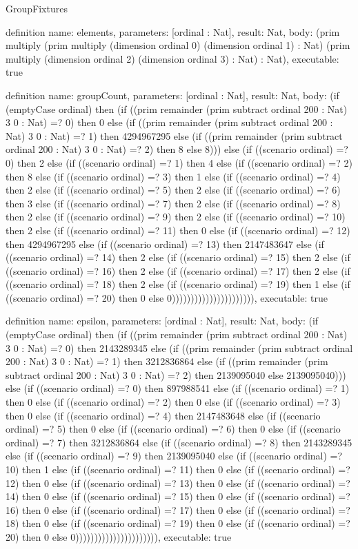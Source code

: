 \begin{lexlean}{GroupFixtures}
\begin{semanticmodule}
definition{
  name: elements,
  parameters: [ordinal : Nat],
  result: Nat,
  body: (prim multiply (prim multiply (dimension ordinal 0) (dimension ordinal 1) : Nat) (prim multiply (dimension ordinal 2) (dimension ordinal 3) : Nat) : Nat),
  executable: true
}

definition{
  name: groupCount,
  parameters: [ordinal : Nat],
  result: Nat,
  body: (if (emptyCase ordinal) then (if ((prim remainder (prim subtract ordinal 200 : Nat) 3 0 : Nat) =? 0) then 0 else (if ((prim remainder (prim subtract ordinal 200 : Nat) 3 0 : Nat) =? 1) then 4294967295 else (if ((prim remainder (prim subtract ordinal 200 : Nat) 3 0 : Nat) =? 2) then 8 else 8))) else (if ((scenario ordinal) =? 0) then 2 else (if ((scenario ordinal) =? 1) then 4 else (if ((scenario ordinal) =? 2) then 8 else (if ((scenario ordinal) =? 3) then 1 else (if ((scenario ordinal) =? 4) then 2 else (if ((scenario ordinal) =? 5) then 2 else (if ((scenario ordinal) =? 6) then 3 else (if ((scenario ordinal) =? 7) then 2 else (if ((scenario ordinal) =? 8) then 2 else (if ((scenario ordinal) =? 9) then 2 else (if ((scenario ordinal) =? 10) then 2 else (if ((scenario ordinal) =? 11) then 0 else (if ((scenario ordinal) =? 12) then 4294967295 else (if ((scenario ordinal) =? 13) then 2147483647 else (if ((scenario ordinal) =? 14) then 2 else (if ((scenario ordinal) =? 15) then 2 else (if ((scenario ordinal) =? 16) then 2 else (if ((scenario ordinal) =? 17) then 2 else (if ((scenario ordinal) =? 18) then 2 else (if ((scenario ordinal) =? 19) then 1 else (if ((scenario ordinal) =? 20) then 0 else 0)))))))))))))))))))))),
  executable: true
}

definition{
  name: epsilon,
  parameters: [ordinal : Nat],
  result: Nat,
  body: (if (emptyCase ordinal) then (if ((prim remainder (prim subtract ordinal 200 : Nat) 3 0 : Nat) =? 0) then 2143289345 else (if ((prim remainder (prim subtract ordinal 200 : Nat) 3 0 : Nat) =? 1) then 3212836864 else (if ((prim remainder (prim subtract ordinal 200 : Nat) 3 0 : Nat) =? 2) then 2139095040 else 2139095040))) else (if ((scenario ordinal) =? 0) then 897988541 else (if ((scenario ordinal) =? 1) then 0 else (if ((scenario ordinal) =? 2) then 0 else (if ((scenario ordinal) =? 3) then 0 else (if ((scenario ordinal) =? 4) then 2147483648 else (if ((scenario ordinal) =? 5) then 0 else (if ((scenario ordinal) =? 6) then 0 else (if ((scenario ordinal) =? 7) then 3212836864 else (if ((scenario ordinal) =? 8) then 2143289345 else (if ((scenario ordinal) =? 9) then 2139095040 else (if ((scenario ordinal) =? 10) then 1 else (if ((scenario ordinal) =? 11) then 0 else (if ((scenario ordinal) =? 12) then 0 else (if ((scenario ordinal) =? 13) then 0 else (if ((scenario ordinal) =? 14) then 0 else (if ((scenario ordinal) =? 15) then 0 else (if ((scenario ordinal) =? 16) then 0 else (if ((scenario ordinal) =? 17) then 0 else (if ((scenario ordinal) =? 18) then 0 else (if ((scenario ordinal) =? 19) then 0 else (if ((scenario ordinal) =? 20) then 0 else 0)))))))))))))))))))))),
  executable: true
}


\end{semanticmodule}
\end{lexlean}
